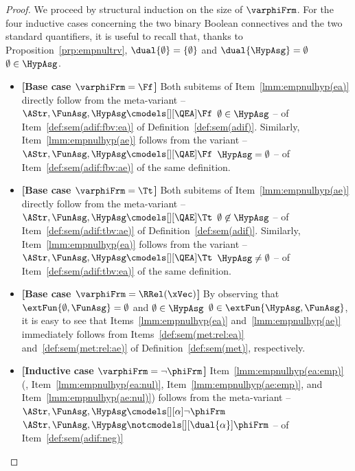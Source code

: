 \documentclass[authoryear]{elsarticle}
\newcommand{\EmpTeamAsg}{\emptyset}
\newcommand{\EmpHypAsg}{\emptyset}
\newcommand{\NulHypAsg}{\{\emptyset\}}
\begin{document}
\begin{proof}
  We proceed by structural induction on the size of $\varphiFrm$.
  For the four inductive cases concerning the two binary Boolean connectives and
  the two standard quantifiers, it is useful to recall that, thanks to
  Proposition~\ref{prp:empnultrv}, $\dual{\EmpHypAsg} = \NulHypAsg$ and
  $\dual{\HypAsg} = \EmpHypAsg$ \iff $\EmpTeamAsg \in \HypAsg$.
  \begin{itemize}[$\bullet$]
    \item\textbf{[Base case $\varphiFrm = \Ff$]}
      Both subitems of Item~\ref{lmm:empnulhyp(ea)} directly follow from the
      meta-variant -- $\AStr, \FunAsg, \HypAsg \cmodels[][\QEA] \Ff$ \iff
      $\EmpTeamAsg \in \HypAsg$ -- of Item~\ref{def:sem(adif:fbv:ea)} of
      Definition~\ref{def:sem(adif)}.
      Similarly, Item~\ref{lmm:empnulhyp(ae)} follows from the variant --
      $\AStr, \FunAsg, \HypAsg \cmodels[][\QAE] \Ff$ \iff $\HypAsg = \EmpHypAsg$
      -- of Item~\ref{def:sem(adif:fbv:ae)} of the same definition.
    \item\textbf{[Base case $\varphiFrm = \Tt$]}
      Both subitems of Item~\ref{lmm:empnulhyp(ae)} directly follow from the
      meta-variant -- $\AStr, \FunAsg, \HypAsg \cmodels[][\QAE] \Tt$ \iff
      $\EmpTeamAsg \not\in \HypAsg$ -- of Item~\ref{def:sem(adif:tbv:ae)} of
      Definition~\ref{def:sem(adif)}.
      Similarly, Item~\ref{lmm:empnulhyp(ea)} follows from the variant --
      $\AStr, \FunAsg, \HypAsg \cmodels[][\QEA] \Tt$ \iff $\HypAsg \neq
      \EmpHypAsg$ -- of Item~\ref{def:sem(adif:tbv:ea)} of the same definition.
    \item\textbf{[Base case $\varphiFrm = \RRel(\xVec)$]}
      By observing that $\extFun{\EmpHypAsg, \FunAsg} = \EmpHypAsg$ and
      $\EmpTeamAsg \in \HypAsg$ \iff $\EmpTeamAsg \in \extFun{\HypAsg,
        \FunAsg}$, it is easy to see that Items~\ref{lmm:empnulhyp(ea)}
      and~\ref{lmm:empnulhyp(ae)} immediately follows from
      Items~\ref{def:sem(met:rel:ea)} and~\ref{def:sem(met:rel:ae)} of
      Definition~\ref{def:sem(met)}, respectively.
    \item\textbf{[Inductive case $\varphiFrm = \neg \phiFrm$]}
      Item~\ref{lmm:empnulhyp(ea:emp)} (\resp, Item~\ref{lmm:empnulhyp(ea:nul)},
      Item~\ref{lmm:empnulhyp(ae:emp)}, and Item~\ref{lmm:empnulhyp(ae:nul)})
      follows from the meta-variant -- $\AStr, \FunAsg, \HypAsg
      \cmodels[][\alpha] \neg \phiFrm$ \iff $\AStr, \FunAsg, \allowbreak \HypAsg
      \notcmodels[][\dual{\alpha}] \phiFrm$ -- of Item~\ref{def:sem(adif:neg)}

\end{itemize}
\end{proof}
\end{document}
